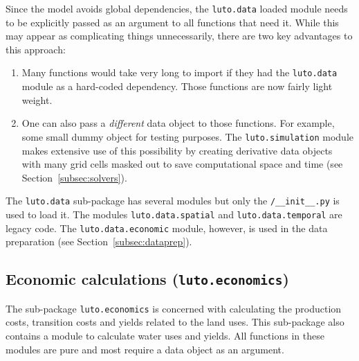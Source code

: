 \documentclass[12pt,a4paper,twoside]{article}
\begin{document}
Since the model avoids global dependencies, the \texttt{luto.data} loaded module needs to be explicitly passed as an argument to all functions that need it. While this may appear as complicating things unnecessarily, there are two key advantages to this approach:
\begin{enumerate}
	\item Many functions would take very long to import if they had the \texttt{luto.data} module as a hard-coded dependency. Those functions are now fairly light weight.
	\item One can also pass a \emph{different} data object to those functions. For example, some small dummy object for testing purposes. The \texttt{luto.simulation} module makes extensive use of this possibility by creating derivative data objects with many grid cells masked out to save computational space and time (see Section~\ref{subsec:solvers}).
\end{enumerate}

The \texttt{luto.data} sub-package has several modules but only the \texttt{/__init__.py} is used to load it. The modules
\texttt{luto.data.spatial} and \texttt{luto.data.temporal} are legacy code. The \texttt{luto.data.economic} module, however, is used in the data preparation (see Section~\ref{subsec:dataprep}).

\subsection{Economic calculations (\texttt{luto.economics})}
The sub-package \texttt{luto.economics} is concerned with calculating the production costs, transition costs and yields related to the land uses. This sub-package also contains a module to calculate water uses and yields. All functions in these modules are pure and most require a data object as an argument.
\end{document}
